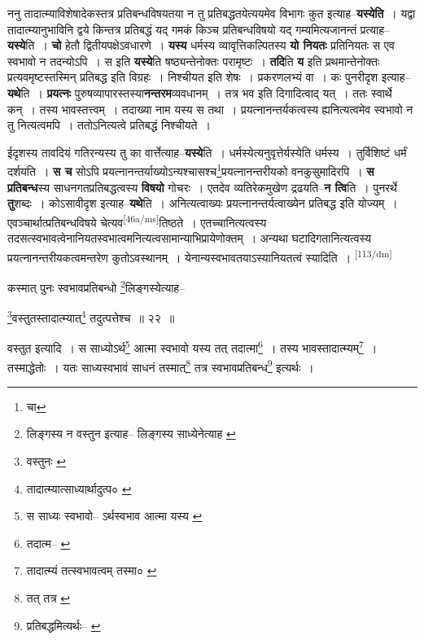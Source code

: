 \documentclass[article,12pt,a4paper]{memoir}
\begin{document}
	  \pstart ननु तादात्म्याविशेषादेकस्तत्र प्रतिबन्धविषयतया न तु प्रतिबद्धतयेत्ययमेव विभागः कुत इत्याह--\textbf{यस्येति} । यद्वा तादात्म्यानुभाविनि द्वये किन्तत्र प्रतिबद्धं यद् गमकं किञ्च प्रतिबन्धविषयो यद् गम्यमित्यजानन्तं प्रत्याह--\textbf{यस्ये}ति । \textbf{चो} हेतौ द्वितीयपक्षेऽवधारणे । \textbf{यस्य} धर्मस्य व्यावृत्तिकल्पितस्य \textbf{यो नियतः} प्रतिनियतः स एव स्वभावो न तदन्योऽपि । स इति \textbf{यस्ये}ति षष्ठ्यन्तेनोक्तः परामृष्टः । \textbf{तदि}ति \textbf{य} इति प्रथमान्तेनोक्तः प्रत्यवमृष्टस्तस्मिन् प्रतिबद्ध इति विग्रहः । निश्चीयत इति शेषः । प्रकरणलभ्यं वा । कः पुनरीदृश इत्याह--\textbf{यथे}ति । \textbf{प्रयत्नः} पुरुषव्यापारस्तस्या\textbf{नन्तरम}व्यवधानम् । तत्र भव इति दिगादित्वाद् यत् । ततः स्वार्थे कन् । तस्य भावस्तत्त्वम् । तदाख्या नाम यस्य स तथा । प्रयत्नानन्तर्यकत्वस्य ह्यनित्यत्वमेव स्वभावो न तु नित्यत्वमपि । ततोऽनित्यत्वे प्रतिबद्धं निश्चीयते ।
	\pend
      

	  \pstart ईदृशस्य तावदियं गतिरन्यस्य तु का वार्त्तेत्याह--\textbf{यस्ये}ति । धर्मस्येत्यनुवृत्तेर्यस्येति धर्मस्य । तुर्विशिष्टं धर्मं दर्शयति । \textbf{स च} सोऽपि प्रयत्नानन्तर्याख्योऽन्यश्चासश्च\footnote{चा}प्रयत्नानन्तरीयको वनकुसुमादिरपि । \textbf{स प्रतिबन्ध}स्य साधनगतप्रतिबद्धत्वस्य \textbf{विषयो} गोचरः । एतदेव व्यतिरेकमुखेण द्रढयति--\textbf{न त्वि}ति । पुनरर्थे \textbf{तु}शब्दः । कोऽसावीदृश इत्याह--\textbf{यथे}ति । अनित्यत्वाख्यः प्रयत्नानन्तर्यत्वाख्येन प्रतिबद्ध इति योज्यम् । एवञ्चार्थात्प्रतिबन्धविषये चेत्यव\leavevmode\textsuperscript{\rmlatinfont\tiny [46a/ms]}तिष्ठते । एतच्चानित्यत्वस्य तदसत्स्वभावत्वेनानियतस्वभात्वमनित्यत्वसामान्याभिप्रायेणोक्तम् । अन्यथा घटादिगतानित्यत्वस्य प्रयत्नानन्तरीयकत्वमन्तरेण कुतोऽवस्थानम् । येनान्यस्वभावतयाऽस्यानियतत्वं स्यादिति ।
	\pend
      \leavevmode\textsuperscript{\rmlatinfont\tiny [113/dm]}

	  \pstart कस्मात् पुनः स्वभावप्रतिबन्धो \footnote{लिङ्गस्य न वस्तुन इत्याह--\cite{dp-msB} \cite{dp-msD} \cite{dp-edH} लिङ्गस्य साध्येनेत्याह \cite{dp-edN}}लिङ्गस्येत्याह--
	\pend
       

	  \pstart \footnote{वस्तुनः \cite{dp-edP}}वस्तुतस्तादात्म्यात्\footnote{तादात्म्यात्साध्यार्थादुत्प० \cite{dp-msB} \cite{dp-edP} \cite{dp-edH} \cite{dp-edE} \cite{dp-edN}} तदुत्पत्तेश्च ॥ २२ ॥
	\pend
       

	  \pstart वस्तुत इत्यादि । स साध्योऽर्थ\footnote{स साध्यः स्वभावो--\cite{dp-msB} ऽर्थस्वभाव आत्मा यस्य \cite{dp-msD}} आत्मा स्वभावो यस्य तत् तदात्मा\footnote{तदात्म--\cite{dp-msC} \cite{dp-msD}} । तस्य भावस्तादात्म्यम्\footnote{तादात्म्यं तत्स्वभावत्वम् तस्मा० \cite{dp-msB}} । तस्माद्धेतोः । यतः साध्यस्वभावं साधनं तस्मात्\footnote{तत् तत्र \cite{dp-msB} \cite{dp-edN} \cite{dp-edH}} तत्र स्वभावप्रतिबन्ध\footnote{प्रतिबद्धमित्यर्थः--\cite{dp-msA} \cite{dp-msB} \cite{dp-edP} \cite{dp-edH} \cite{dp-edE} \cite{dp-edN}} इत्यर्थः ।
	\pend
       
\end{document}
